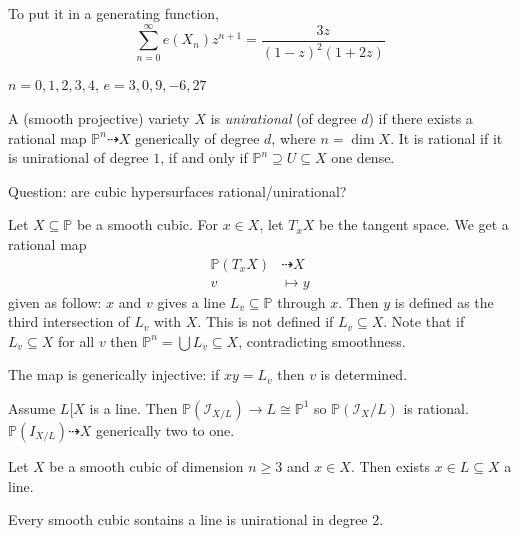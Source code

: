 \documentclass[a4paper]{article}
\renewcommand*{\P}{\mathbb{P}}
\newcommand{\sh}[1]{\mathcal{#1}} %
\newcommand{\rational}{\dashrightarrow} %
\begin{document}
To put it in a generating function,
\[
  \sum_{n = 0}^\infty e(X_n) z^{n + 1} = \frac{3z}{(1 - z)^2 (1 + 2z)}
\]

\(n = 0, 1, 2, 3, 4\), \(e = 3, 0, 9, -6, 27\)

\begin{definition}
  A (smooth projective) variety \(X\) is \emph{unirational} (of degree \(d\)) if there exists a rational map \(\P^n \rational X\) generically of degree \(d\), where \(n = \dim X\). It is rational if it is unirational of degree \(1\), if and only if \(\P^n \supseteq U \subseteq X\) one dense.
\end{definition}

Question: are cubic hypersurfaces rational/unirational?

Let \(X \subseteq \P\) be a smooth cubic. For \(x \in X\), let \(T_xX\) be the tangent space. We get a rational map
\begin{align*}
  \P(T_xX) &\rational X \\
  v &\mapsto y
\end{align*}
given as follow: \(x\) and \(v\) gives a line \(L_v \subseteq \P\) through \(x\). Then \(y\) is defined as the third intersection of \(L_v\) with \(X\). This is not defined if \(L_v \subseteq X\). Note that if \(L_v \subseteq X\) for all \(v\) then \(\P^n = \bigcup L_v \subseteq X\), contradicting smoothness.

The map is generically injective: if \(xy = L_v\) then \(v\) is determined.

Assume \(L [ X\) is a line. Then \(\P(\sh I_{X/L}) \to L \cong \P^1\) so \(\P(\sh I_X/L)\) is rational. \(\P(I_{X/L}) \rational X\) generically two to one.

\begin{eg}
  
\end{eg}

\begin{proposition}
  Let \(X\) be a smooth cubic of dimension \(n \geq 3\) and \(x \in X\). Then exists \(x \in L \subseteq X\) a line.
\end{proposition}

\begin{corollary}
  Every smooth cubic sontains a line is unirational in degree \(2\).
\end{corollary}
\end{document}
